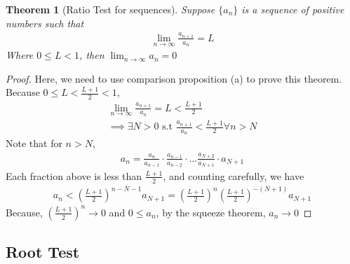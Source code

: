 \documentclass[12pt]{book}
\newtheorem{theorem}{Theorem}
\theoremstyle{definition}
\begin{document}
\begin{theorem}[Ratio Test for sequences]
\label{seq_ratio_test_thm}
Suppose $\{a_n\}$ is a sequence of positive numbers such that
\begin{align*}
	\lim_{n\to \infty} \frac{a_{n+1}}{a_n} = L
\end{align*}
Where $0\leq L < 1$, then $\lim_{n \to \infty}a_n =0$ 
\end{theorem}
\begin{proof}
Here, we need to use comparison proposition (a) to prove this theorem. Because $0 \leq L<\frac{L+1}{2}<1$,
\begin{align*}
\lim_{n\to \infty}\frac{a_{n+1}}{a_n} = L < \frac{L+1}{2}\\	
\implies \exists N > 0 \text{ s.t } \frac{a_{n+1}}{a_n} < \frac{L+1}{2} \forall n>N
\end{align*}
Note that for $n>N$, 
\begin{align*}
a_n = \frac{a_n}{a_{n-1}}\cdot \frac{a_{n-1}}{a_{n-2}}\cdot... \frac{a_{N+2}}{a_{N+1}}\cdot a_{N+1}
\end{align*}
Each fraction above is less than $\frac{L+1}{2}$, and counting carefully, we have 
\begin{align*}
	a_n < \left(\frac{L+1}{2}\right)^{n-N-1}a_{N+1} = \left(\frac{L+1}{2}\right)^n\left(\frac{L+1}{2}\right)^{-(N+1)}a_{N+1}
\end{align*} 
Because, $\left(\frac{L+1}{2}\right)^n \to 0$ and $0\leq a_n$, by the squeeze theorem, $a_n \to 0$

\end{proof}

\subsection{Root Test}
\end{document}
